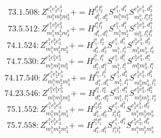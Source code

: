 \documentclass[letterpaper,10pt,fleqn,leqno,onecolumn]{article}
\begin{document}
\begin{equation} \;\;\;\;\;\;  73.1.508: Z^{e_{1}^{b}e_{2}^{b}e_{3}^{b}}_{m_{1}^{b}m_{2}^{b}m_{3}^{b}}+=H^{l_{1}^{b}l_{2}^{b}}_{d_{1}^{b},d_{2}^{b}}S^{e_{1}^{b},d_{1}^{b}}_{m_{1}^{b}m_{2}^{b}}S^{e_{2}^{b}e_{3}^{b},d_{2}^{b}}_{m_{3}^{b},l_{1}^{b}l_{2}^{b}} \end{equation}
\begin{equation} \;\;\;\;\;\;  73.5.512: Z^{e_{1}^{b}e_{2}^{b}e_{3}^{b}}_{m_{1}^{b}m_{2}^{b}m_{3}^{b}}+=H^{l_{1}^{a}l_{1}^{b}}_{d_{1}^{b},d_{1}^{a}}S^{e_{1}^{b},d_{1}^{b}}_{m_{1}^{b}m_{2}^{b}}S^{e_{2}^{b}e_{3}^{b},d_{1}^{a}}_{m_{3}^{b},l_{1}^{a}l_{1}^{b}} \end{equation}
\begin{equation} \;\;\;\;\;\;  74.1.524: Z^{e_{1}^{b}e_{2}^{b}e_{3}^{b}}_{m_{1}^{b}m_{2}^{b}m_{3}^{b}}+=H^{l_{1}^{b},l_{2}^{b}}_{d_{1}^{b},d_{2}^{b}}S^{e_{1}^{b},d_{1}^{b}}_{m_{1}^{b},l_{1}^{b}}S^{e_{2}^{b}e_{3}^{b},d_{2}^{b}}_{m_{2}^{b}m_{3}^{b},l_{2}^{b}} \end{equation}
\begin{equation} \;\;\;\;\;\;  74.7.530: Z^{e_{1}^{b}e_{2}^{b}e_{3}^{b}}_{m_{1}^{b}m_{2}^{b}m_{3}^{b}}+=H^{l_{1}^{b},l_{1}^{a}}_{d_{1}^{b},d_{1}^{a}}S^{e_{1}^{b},d_{1}^{b}}_{m_{1}^{b},l_{1}^{b}}S^{e_{2}^{b}e_{3}^{b},d_{1}^{a}}_{m_{2}^{b}m_{3}^{b},l_{1}^{a}} \end{equation}
\begin{equation} \;\;\;\;\;\;  74.17.540: Z^{e_{1}^{b}e_{2}^{b}e_{3}^{b}}_{m_{1}^{b}m_{2}^{b}m_{3}^{b}}+=H^{l_{1}^{a},l_{1}^{b}}_{d_{1}^{a},d_{1}^{b}}S^{e_{1}^{b},d_{1}^{a}}_{m_{1}^{b},l_{1}^{a}}S^{e_{2}^{b}e_{3}^{b},d_{1}^{b}}_{m_{2}^{b}m_{3}^{b},l_{1}^{b}} \end{equation}
\begin{equation} \;\;\;\;\;\;  74.23.546: Z^{e_{1}^{b}e_{2}^{b}e_{3}^{b}}_{m_{1}^{b}m_{2}^{b}m_{3}^{b}}+=H^{l_{1}^{a},l_{2}^{a}}_{d_{1}^{a},d_{2}^{a}}S^{e_{1}^{b},d_{1}^{a}}_{m_{1}^{b},l_{1}^{a}}S^{e_{2}^{b}e_{3}^{b},d_{2}^{a}}_{m_{2}^{b}m_{3}^{b},l_{2}^{a}} \end{equation}
\begin{equation} \;\;\;\;\;\;  75.1.552: Z^{e_{1}^{b}e_{2}^{b}e_{3}^{b}}_{m_{1}^{b}m_{2}^{b}m_{3}^{b}}+=H^{l_{1}^{b}l_{2}^{b}}_{d_{1}^{b},d_{2}^{b}}S^{e_{1}^{b},d_{1}^{b}}_{l_{1}^{b}l_{2}^{b}}S^{e_{2}^{b}e_{3}^{b},d_{2}^{b}}_{m_{1}^{b}m_{2}^{b}m_{3}^{b}} \end{equation}
\begin{equation} \;\;\;\;\;\;  75.7.558: Z^{e_{1}^{b}e_{2}^{b}e_{3}^{b}}_{m_{1}^{b}m_{2}^{b}m_{3}^{b}}+=H^{l_{1}^{a}l_{1}^{b}}_{d_{1}^{a},d_{1}^{b}}S^{e_{1}^{b},d_{1}^{a}}_{l_{1}^{a}l_{1}^{b}}S^{e_{2}^{b}e_{3}^{b},d_{1}^{b}}_{m_{1}^{b}m_{2}^{b}m_{3}^{b}} \end{equation}
\end{document}
